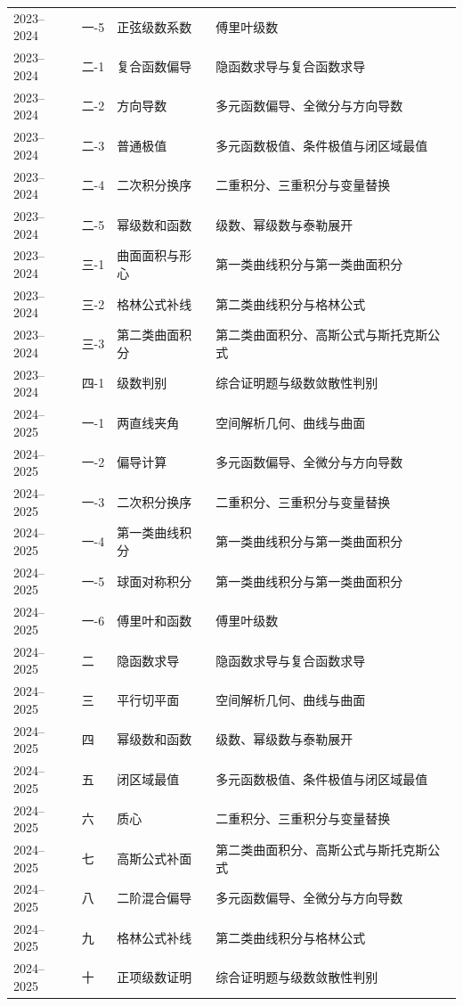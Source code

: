 ﻿\documentclass[11pt,a4paper,UTF8]{ctexart}
\begin{document}
\begin{longtable}{p{2.0cm}p{1.8cm}p{4.2cm}p{6.2cm}}
2023--2024 & 一-5 & 正弦级数系数 & 傅里叶级数\\
2023--2024 & 二-1 & 复合函数偏导 & 隐函数求导与复合函数求导\\
2023--2024 & 二-2 & 方向导数 & 多元函数偏导、全微分与方向导数\\
2023--2024 & 二-3 & 普通极值 & 多元函数极值、条件极值与闭区域最值\\
2023--2024 & 二-4 & 二次积分换序 & 二重积分、三重积分与变量替换\\
2023--2024 & 二-5 & 幂级数和函数 & 级数、幂级数与泰勒展开\\
2023--2024 & 三-1 & 曲面面积与形心 & 第一类曲线积分与第一类曲面积分\\
2023--2024 & 三-2 & 格林公式补线 & 第二类曲线积分与格林公式\\
2023--2024 & 三-3 & 第二类曲面积分 & 第二类曲面积分、高斯公式与斯托克斯公式\\
2023--2024 & 四-1 & 级数判别 & 综合证明题与级数敛散性判别\\
2024--2025 & 一-1 & 两直线夹角 & 空间解析几何、曲线与曲面\\
2024--2025 & 一-2 & 偏导计算 & 多元函数偏导、全微分与方向导数\\
2024--2025 & 一-3 & 二次积分换序 & 二重积分、三重积分与变量替换\\
2024--2025 & 一-4 & 第一类曲线积分 & 第一类曲线积分与第一类曲面积分\\
2024--2025 & 一-5 & 球面对称积分 & 第一类曲线积分与第一类曲面积分\\
2024--2025 & 一-6 & 傅里叶和函数 & 傅里叶级数\\
2024--2025 & 二 & 隐函数求导 & 隐函数求导与复合函数求导\\
2024--2025 & 三 & 平行切平面 & 空间解析几何、曲线与曲面\\
2024--2025 & 四 & 幂级数和函数 & 级数、幂级数与泰勒展开\\
2024--2025 & 五 & 闭区域最值 & 多元函数极值、条件极值与闭区域最值\\
2024--2025 & 六 & 质心 & 二重积分、三重积分与变量替换\\
2024--2025 & 七 & 高斯公式补面 & 第二类曲面积分、高斯公式与斯托克斯公式\\
2024--2025 & 八 & 二阶混合偏导 & 多元函数偏导、全微分与方向导数\\
2024--2025 & 九 & 格林公式补线 & 第二类曲线积分与格林公式\\
2024--2025 & 十 & 正项级数证明 & 综合证明题与级数敛散性判别\\
\bottomrule
\end{longtable}
\end{document}
